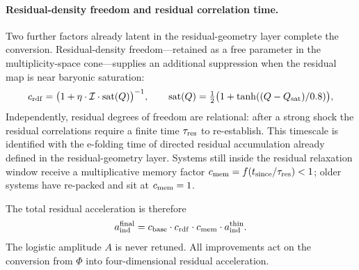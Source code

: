 \documentclass[11pt,a4paper]{article}
\begin{document}
\paragraph{Residual-density freedom and residual correlation time.}
Two further factors already latent in the residual-geometry layer complete the conversion. Residual-density freedom---retained as a free parameter in the multiplicity-space cone---supplies an additional suppression when the residual map is near baryonic saturation:
\begin{equation}
c_{\rm rdf}=\bigl(1+\eta\cdot\mathcal{I}\cdot{\rm sat}(Q)\bigr)^{-1},
\qquad
{\rm sat}(Q)=\tfrac12\bigl(1+\tanh((Q-Q_{\rm sat})/0.8)\bigr),
\label{eq:c-rdf}
\end{equation}
Independently, residual degrees of freedom are relational: after a strong shock the residual correlations require a finite time \(\tau_{\rm res}\) to re-establish. This timescale is identified with the e-folding time of directed residual accumulation already defined in the residual-geometry layer. Systems still inside the residual relaxation window receive a multiplicative memory factor \(c_{\rm mem}=f(t_{\rm since}/\tau_{\rm res})<1\); older systems have re-packed and sit at \(c_{\rm mem}=1\).

The total residual acceleration is therefore
\begin{equation}
a_{\rm ind}^{\rm final}=c_{\rm base}\cdot c_{\rm rdf}\cdot c_{\rm mem}\cdot a_{\rm ind}^{\rm thin}.
\label{eq:a-ind-final}
\end{equation}
The logistic amplitude \(A\) is never retuned. All improvements act on the conversion from \(\Phi\) into four-dimensional residual acceleration.
\end{document}
